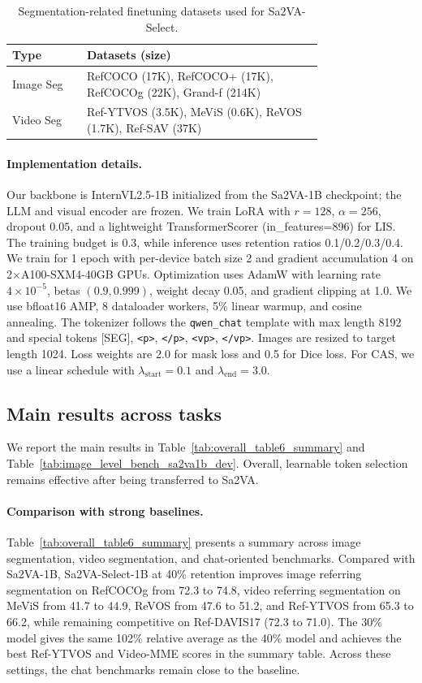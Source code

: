 \begin{table}[t]
\caption{Segmentation-related finetuning datasets used for Sa2VA-Select.}
\label{tab:train_datasets_seg}
\centering
\small
\setlength{\tabcolsep}{3pt}
\begin{tabular}{l p{0.76\linewidth}}
\toprule
Type & Datasets (size) \\
\midrule
Image Seg & RefCOCO (17K), RefCOCO+ (17K), RefCOCOg (22K), Grand-f (214K) \\
Video Seg & Ref-YTVOS (3.5K), MeViS (0.6K), ReVOS (1.7K), Ref-SAV (37K) \\
\bottomrule
\end{tabular}
\end{table}

\paragraph{Implementation details.}
Our backbone is InternVL2.5-1B initialized from the Sa2VA-1B checkpoint; the LLM and visual encoder are frozen.
We train LoRA with $r=128$, $\alpha=256$, dropout $0.05$, and a lightweight TransformerScorer (in\_features=896) for LIS.
The training budget is 0.3, while inference uses retention ratios 0.1/0.2/0.3/0.4.
We train for 1 epoch with per-device batch size 2 and gradient accumulation 4 on 2$\times$A100-SXM4-40GB GPUs.
Optimization uses AdamW with learning rate $4\times10^{-5}$, betas $(0.9,0.999)$, weight decay 0.05, and gradient clipping at 1.0.
We use bfloat16 AMP, 8 dataloader workers, 5\% linear warmup, and cosine annealing.
The tokenizer follows the \texttt{qwen\_chat} template with max length 8192 and special tokens [SEG], \texttt{<p>}, \texttt{</p>}, \texttt{<vp>}, \texttt{</vp>}.
Images are resized to target length 1024. Loss weights are 2.0 for mask loss and 0.5 for Dice loss.
For CAS, we use a linear schedule with $\lambda_{\mathrm{start}}=0.1$ and $\lambda_{\mathrm{end}}=3.0$.

\subsection{Main results across tasks}
We report the main results in Table~\ref{tab:overall_table6_summary} and Table~\ref{tab:image_level_bench_sa2va1b_dev}.
Overall, learnable token selection remains effective after being transferred to Sa2VA.

\paragraph{Comparison with strong baselines.}
Table~\ref{tab:overall_table6_summary} presents a summary across image segmentation, video segmentation, and chat-oriented benchmarks.
Compared with Sa2VA-1B, Sa2VA-Select-1B at 40\% retention improves image referring segmentation on RefCOCOg from 72.3 to 74.8, video referring segmentation on MeViS from 41.7 to 44.9, ReVOS from 47.6 to 51.2, and Ref-YTVOS from 65.3 to 66.2, while remaining competitive on Ref-DAVIS17 (72.3 to 71.0).
The 30\% model gives the same 102\% relative average as the 40\% model and achieves the best Ref-YTVOS and Video-MME scores in the summary table.
Across these settings, the chat benchmarks remain close to the baseline.

